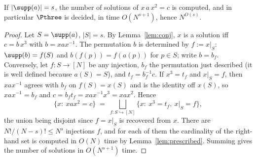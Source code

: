 \begin{lem}\label{lem:support}
If $|\supp(a)|=s$, the number of solutions of $x\,a\,x^{2}=c$ is computed, and in particular $\Pthree$ is decided, in time $O(N^{s+1})$, hence $N^{O(s)}$.
\end{lem}
\begin{proof}
Let $S=\supp(a)$, $|S|=s$. By Lemma~\ref{lem:conj}, $x$ is a solution iff $c=b\,x^{3}$ with $b=xax^{-1}$. The permutation $b$ is determined by $f:=x|_{S}$: $\supp(b)=f(S)$ and $b(f(p))=f(a(p))$ for $p\in S$; write $b=b_f$. Conversely, let $f\colon S\to[N]$ be any injection, $b_f$ the permutation just described (it is well defined because $a(S)=S$), and $t_f=b_f^{-1}c$. If $x^{3}=t_f$ and $x|_S=f$, then $xax^{-1}$ agrees with $b_f$ on $f(S)=x(S)$ and is the identity off $x(S)$, so $xax^{-1}=b_f$ and $c=b_f t_f=xax^{-1}x^{3}=xax^{2}$. Hence
\[
\{x:\ xax^{2}=c\}\;=\;\bigsqcup_{f\colon S\hookrightarrow[N]}\{x:\ x^{3}=t_f,\ x|_{S}=f\},
\]
the union being disjoint since $f=x|_S$ is recovered from $x$. There are $N!/(N-s)!\le N^{s}$ injections $f$, and for each of them the cardinality of the right-hand set is computed in $O(N)$ time by Lemma~\ref{lem:prescribed}. Summing gives the number of solutions in $O(N^{s+1})$ time.
\end{proof}

